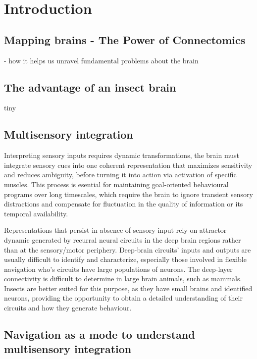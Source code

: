 
\chapter{Introduction}  


\section{Mapping brains - The Power of Connectomics} 
\label{section1.1}
- how it helps us unravel fundamental problems about the brain 


\section{The advantage of an insect brain}
    tiny


\section{Multisensory integration} 

    Interpreting sensory inputs requires dynamic transformations, the brain must integrate sensory cues into one coherent representation that maximizes sensitivity and reduces ambiguity, before turning it into action via
    activation of specific muscles. This process is esential for maintaining goal-oriented behavioural programs over long timescales, which require the brain to ignore transient sensory distractions and compensate for fluctuation in the quality of information or its temporal availability.

    Representations that persist in absence of sensory input rely on attractor dynamic generated by recurral neural circuits in the deep brain regions rather than at the sensory/motor periphery. Deep-brain circuits' inputs and outputs are usually difficult to identify and characterize, especially those involved in flexible navigation who's circuits have large populations of neurons.
    The deep-layer connectivity is difficult to determine in large brain animals, such as mammals. Insects are better suited for this purpose, as they have small brains and identified neurons, providing the opportunity to obtain a detailed understanding of their circuits and how they generate behaviour. 


\section{Navigation as a mode to understand multisensory integration}

